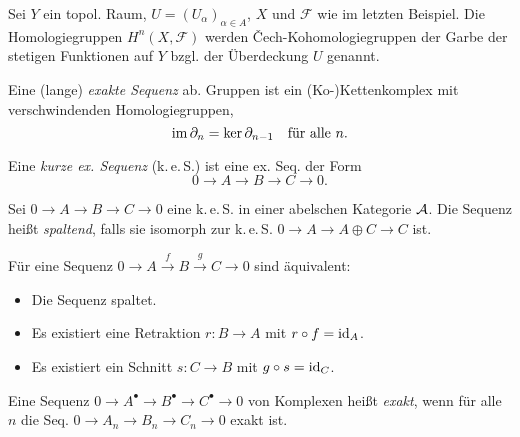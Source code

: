 \documentclass{cheat-sheet}
\newcommand{\CCC}[1]{{#1}^{\bullet}} %
\newcommand{\keS}{k.\,e.\,S.} %
\begin{document}

\begin{bsp}
  Sei $Y$ ein topol. Raum, $U = (U_\alpha)_{\alpha \in A}$, $X$ und $\mathcal{F}$ wie im letzten Beispiel. Die Homologiegruppen $H^n(X, \mathcal{F})$ werden Čech-Kohomologiegruppen der Garbe der stetigen Funktionen auf $Y$ bzgl. der Überdeckung $U$ genannt.
\end{bsp}




\begin{defn}
  Eine (lange) \emph{exakte Sequenz} ab. Gruppen ist ein (Ko-)Kettenkomplex mit verschwindenden Homologiegruppen, \dh{}
  \[ \operatorname{im} \partial_n = \ker \partial_{n-1} \quad \text{für alle $n$.} \]
\end{defn}

\begin{defn}
  Eine \emph{kurze ex. Sequenz} (\keS{}) ist eine ex. Seq. der Form
  \[ 0 \to A \to B \to C \to 0. \]
\end{defn}

\begin{defn}
  Sei $0 \to A \to B \to C \to 0$ eine \keS{} in einer abelschen Kategorie $\mathcal{A}$. Die Sequenz heißt \emph{spaltend}, falls sie isomorph zur \keS{} $0 \to A \to A \oplus C \to C$ ist.
\end{defn}

\begin{prop}
  Für eine Sequenz $0 \to A \xrightarrow{f} B \xrightarrow{g} C \to 0$ sind äquivalent:
  \begin{itemize}
    \item Die Sequenz spaltet.
    \item Es existiert eine Retraktion $r : B \to A$ mit $r \circ f = \operatorname{id}_A$.
    \item Es existiert ein Schnitt $s : C \to B$ mit $g \circ s = \operatorname{id}_C$.
  \end{itemize}
\end{prop}

\begin{defn}
  Eine Sequenz $0 \to \CCC{A} \to \CCC{B} \to \CCC{C} \to 0$ von Komplexen heißt \emph{exakt}, wenn für alle $n$ die Seq. $0 \to A_n \to B_n \to C_n \to 0$ exakt ist.
\end{defn}
\end{document}
